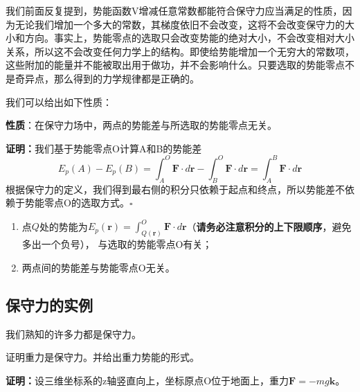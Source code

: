 \documentclass[UTF-8]{ctexart}
\begin{document}
我们前面反复提到，势能函数V增减任意常数都能符合保守力应当满足的性质，因为无论我们增加一个多大的常数，其梯度依旧不会改变，这将不会改变保守力的大小和方向。事实上，势能零点的选取只会改变势能的绝对大小，不会改变相对大小关系，所以这不会改变任何力学上的结构。即使给势能增加一个无穷大的常数项，这些附加的能量并不能被取出用于做功，并不会影响什么。只要选取的势能零点不是奇异点，那么得到的力学规律都是正确的。

我们可以给出如下性质：
\begin{tcolorbox}[colback=white!5!white,colframe=green!50!black,title=保守力场中的势能差]
\textbf{性质}：在保守力场中，两点的势能差与所选取的势能零点无关。
\end{tcolorbox}

\noindent \textbf{证明：}我们基于势能零点O计算A和B的势能差
\[
E_p(A) - E_p(B) = \int_{A}^{O}  \mathbf{F}\cdot d\mathbf{r}  - \int_{B}^{O}  \mathbf{F}\cdot d\mathbf{r} = \int_{A}^{B}  \mathbf{F}\cdot d\mathbf{r} 
\]
根据保守力的定义，我们得到最右侧的积分只依赖于起点和终点，所以势能差不依赖于势能零点O的选取方式。\hfill$\square$
\begin{tcolorbox}[colback=white!5!white, colframe=red!75!black, title=保守场势能小结]
\begin{enumerate}
\item 点$Q$处的势能为$
E_p(\textbf{r}) = \int_{Q(\textbf{r})}^{O}  \mathbf{F}\cdot d\mathbf{r} 
$（\textbf{请务必注意积分的上下限顺序}，避免多出一个负号），
与选取的势能零点O有关；
\item 两点间的势能差与势能零点O无关。
\end{enumerate}
\end{tcolorbox}
\subsection{保守力的实例}
我们熟知的许多力都是保守力。
\begin{tcolorbox}[colback=white!5!white,colframe=green!50!black,title=重力]
证明重力是保守力。并给出重力势能的形式。
\end{tcolorbox}
\noindent \textbf{证明：}设三维坐标系的z轴竖直向上，坐标原点O位于地面上，重力$\mathbf{F} = -mg \mathbf{k}$。
\end{document}
